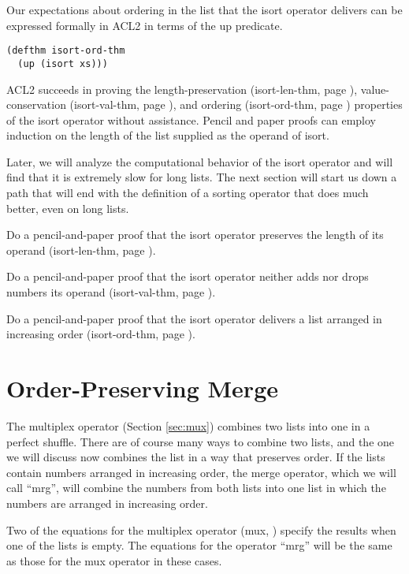 Our expectations about ordering in the list that the isort operator
delivers can be expressed formally in ACL2 in terms of the up predicate.

\label{defthm:isort-ord-thm}
\begin{Verbatim}
(defthm isort-ord-thm
  (up (isort xs)))
\end{Verbatim}

ACL2 succeeds in proving the length-preservation
(isort-len-thm, page \pageref{defthm:isort-len}),
value-conservation
(isort-val-thm, page \pageref{defthm:isort-val}), and ordering
(isort-ord-thm, page \pageref{defthm:isort-ord-thm}) properties
of the isort operator without assistance.
Pencil and paper proofs can employ induction on the length
of the list supplied as the operand of isort.

Later, we will analyze the computational behavior of the isort operator
and will find that it is extremely slow for long lists.
The next section will start us down a path that will
end with the definition of a sorting operator
that does much better, even on long lists.

\begin{ExerciseList}
\Exercise
Do a pencil-and-paper proof that the isort operator
preserves the length of its operand
(isort-len-thm, page \pageref{defthm:isort-len}).

\Exercise
Do a pencil-and-paper proof that the isort operator
neither adds nor drops numbers its operand
(isort-val-thm, page \pageref{defthm:isort-val}).

\Exercise
Do a pencil-and-paper proof that the isort operator
delivers a list arranged in increasing order
(isort-ord-thm, page \pageref{defthm:isort-ord-thm}).
\end{ExerciseList}

\section{Order-Preserving Merge}
\label{sec:mrg}

The multiplex operator (Section \ref{sec:mux})
combines two lists into one in a perfect shuffle.
There are of course many ways to combine two lists,
and the one we will discuss now combines the list
in a way that preserves order.
If the lists contain numbers arranged in increasing order,
the merge operator, which we will call ``mrg'',
will combine the numbers from both lists
into one list in which the numbers are arranged in increasing order.

Two of the equations for the multiplex operator (mux, \pageref{def:mux})
specify the results when one of the lists is empty.
The equations for the operator ``mrg'' will be the same as those for
the mux operator in these cases.

